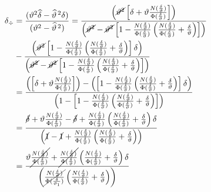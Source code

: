 \documentclass[11pt,twoside,spanish]{report} %
\begin{document}
\begin{equation}
	\begin{split}
		\delta_{\div} &= \frac{(\vartheta^2\widehat{\delta} - \widehat{\vartheta}^{\,2}\delta)}{(\vartheta^2 - \widehat{\vartheta}^{\,2})}
		= \frac{\left(\cancel{\vartheta^2} \left[\delta+\vartheta\frac{N(\frac{\delta}{\vartheta})}{\Phi(\frac{\delta}{\vartheta})}\right]  \right)}{\left(\cancel{\vartheta^2}- \cancel{\vartheta^2}\left[1-\frac{N(\frac{\delta}{\vartheta})}{\Phi(\frac{\delta}{\vartheta})}\left(\frac{N(\frac{\delta}{\vartheta})}{\Phi(\frac{\delta}{\vartheta})}+ \frac{\delta}{\vartheta}\right)\right] \right)}\\
		&- \frac{\left(\cancel{ \vartheta^2}\left[1-\frac{N(\frac{\delta}{\vartheta})}{\Phi(\frac{\delta}{\vartheta})}\left(\frac{N(\frac{\delta}{\vartheta})}{\Phi(\frac{\delta}{\vartheta})}+ \frac{\delta}{\vartheta}\right)\right] \delta\right)}{\left(\cancel{\vartheta^2}- \cancel{\vartheta^2}\left[1-\frac{N(\frac{\delta}{\vartheta})}{\Phi(\frac{\delta}{\vartheta})}\left(\frac{N(\frac{\delta}{\vartheta})}{\Phi(\frac{\delta}{\vartheta})}+ \frac{\delta}{\vartheta}\right)\right] \right)}\\
		&=\frac{\left(\left[\delta+\vartheta\frac{N(\frac{\delta}{\vartheta})}{\Phi(\frac{\delta}{\vartheta})}\right]  \right)-\left(\left[1-\frac{N(\frac{\delta}{\vartheta})}{\Phi(\frac{\delta}{\vartheta})}\left(\frac{N(\frac{\delta}{\vartheta})}{\Phi(\frac{\delta}{\vartheta})}+ \frac{\delta}{\vartheta}\right)\right] \delta\right)}{\left(1- \left[1-\frac{N(\frac{\delta}{\vartheta})}{\Phi(\frac{\delta}{\vartheta})}\left(\frac{N(\frac{\delta}{\vartheta})}{\Phi(\frac{\delta}{\vartheta})}+ \frac{\delta}{\vartheta}\right)\right] \right)} \\
		&=   \frac{\cancel{\delta}+\vartheta\frac{N(\frac{\delta}{\vartheta})}{\Phi(\frac{\delta}{\vartheta})} -\cancel{\delta}+\frac{N(\frac{\delta}{\vartheta})}{\Phi(\frac{\delta}{\vartheta})}\left(\frac{N(\frac{\delta}{\vartheta})}{\Phi(\frac{\delta}{\vartheta})}+ \frac{\delta}{\vartheta}\right) \delta}{\left(\cancel{1}- \cancel{1}+\frac{N(\frac{\delta}{\vartheta})}{\Phi(\frac{\delta}{\vartheta})}\left(\frac{N(\frac{\delta}{\vartheta})}{\Phi(\frac{\delta}{\vartheta})}+ \frac{\delta}{\vartheta}\right) \right)}\\
		&=   \frac{\vartheta\cancel{\frac{N(\frac{\delta}{\vartheta})}{\Phi(\frac{\delta}{\vartheta})}} +\cancel{\frac{N(\frac{\delta}{\vartheta})}{\Phi(\frac{\delta}{\vartheta})}}\left(\frac{N(\frac{\delta}{\vartheta})}{\Phi(\frac{\delta}{\vartheta})}+ \frac{\delta}{\vartheta}\right) \delta}  {\left(\cancel{\frac{N(\frac{\delta}{\vartheta})}{\Phi(\frac{\delta}{\vartheta_1})}}\left(\frac{N(\frac{\delta}{\vartheta})}{\Phi(\frac{\delta}{\vartheta})}+ \frac{\delta}{\vartheta}\right) \right)}

\end{split}
\end{equation}
\end{document}
